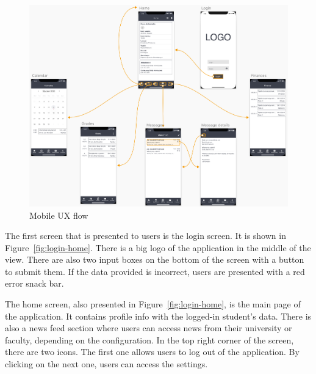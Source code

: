 \begin{figure}[htb]
    \centering
    \includegraphics[width=\textwidth]{fig03/mobile_ux_flow.png}
    \caption{Mobile UX flow}
    \label{fig:ux-flow}
\end{figure}

The first screen that is presented to users is the login screen. It is shown in Figure~\ref{fig:login-home}. There is a big logo of the application in the middle of the view. There are also two input boxes on the bottom of the screen with a button to submit them. If the data provided is incorrect, users are presented with a red error snack bar.

The home screen, also presented in Figure~\ref{fig:login-home}, is the main page of the application. It contains profile info with the logged-in student's data. There is also a news feed section where users can access news from their university or faculty, depending on the configuration. In the top right corner of the screen, there are two icons. The first one allows users to log out of the application. By clicking on the next one, users can access the settings.

